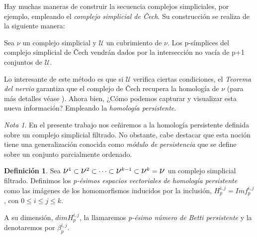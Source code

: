 \documentclass[12pt, a4paper, twoside]{book}
\numberwithin{equation}{section}
\theoremstyle{definition}
\newtheorem{defi}{Definición}[section]
\theoremstyle{remark}
\newtheorem*{remark}{Nota}
\theoremstyle{plain}
\begin{document}
	Hay muchas maneras de construir la secuencia complejos simpliciales, 
	por ejemplo, empleando el \emph{complejo simplicial de Čech}. Su 
	construcción se realiza de la siguiente manera:

	Sea {\Large $\nu$} un complejo simplicial y $\mathcal{U}$ un 
	cubrimiento de {\Large $\nu$}. Los p-símplices del complejo simplicial
	de Čech vendrán dados por la intersección no vacía de p+1 conjuntos de
	$\mathcal{U}$.

	Lo interesante de este método es que si $\mathcal{U}$ verifica ciertas
	condiciones, el \emph{Teorema del nervio} garantiza que el complejo de
	Čech recupera la homología de {\Large $\nu$} (para más detalles véase 
	\cite{TeoremaNervio-Ghrist}). Ahora bien, ¿Cómo 
	podemos capturar y visualizar esta nueva información? Empleando la 
	\emph{homología persistente}.

	\begin{remark}
	En el presente trabajo nos ceñiremos a la homología persistente 
	definida sobre un complejo simplicial filtrado. No obstante, cabe 
	destacar que esta noción tiene una generalización conocida como 
	\emph{módulo de persistencia} que se define sobre un conjunto 
	parcialmente ordenado.
	\end{remark}

	\begin{defi}
	Sea $ \text{{\Large $\nu$}$^{1}$} 
		\subset \text{{\Large $\nu$}$^{2}$} \subset \cdots \subset
		\text{{\Large $\nu$}$^{k-1}$} \subset 
		\text{{\Large $\nu$}$^{k}$} = \text{{\Large $\nu$}}$ un 
		complejo simplicial filtrado. Definimos los \textit{p-ésimos
		espacios vectoriales de homología persistente} como las 
		imágenes de los homomorfismos inducidos por la inclusión, 
		$H_{p}^{i,j}=Imf_{p}^{i,j}$, con $0\leq i \leq j \leq k$.

		A su dimensión, $dimH_{p}^{i,j}$, la llamaremos \textit{p-ésimo 
		número de Betti persistente} y la denotaremos por 
		$\beta_{p}^{i,j}$.
	\end{defi}
\end{document}
